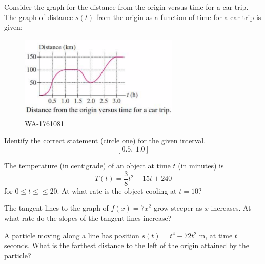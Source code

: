 \documentclass[12pt,addpoints, answers, fleqn]{exam}
\begin{document}
\begin{teacher}
\begin{questions}
\question 	%

Consider the graph for the distance from the origin versus time for a car trip.
The graph of distance $s\left(t\right)$ from the origin as a function of time for a car trip is given:
 \begin{figure}[htbp] %
    \centering
    \includegraphics[width=3in]{./graphics/1761049.pdf} 
    \caption{WA-1761081}
    \label{fig:1761049}
 \end{figure}
Identify the correct statement (circle one) for the given interval.
\[
\left[ 0.5, \ 1.0 \right]
\]


\question 	%

The temperature (in centigrade) of an object at time $t$ (in minutes) is
\[ 
T\left(t\right) = \frac{3}{8} t^2 - 15t + 240
\]
for $0 \leq  t \leq ≤ 20$. At what rate is the object cooling at $t = 10$?



\question 	%

The tangent lines to the graph of $f\left(x\right) = 7x^2$ grow steeper as $x$ increases. At what rate do the slopes of the tangent lines increase?
 
\question 	%

A particle moving along a line has position $s\left(t\right) = t^4 - 72t^2$ m, at time $t$seconds. What is the farthest distance to the left of the origin attained by the particle?

\end{questions}
\end{teacher}
\vfill
\pagebreak
\end{document}
